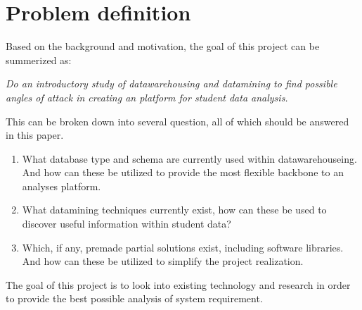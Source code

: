 \section{Problem definition}
	Based on the background and motivation, the goal of this project can be summerized as: 
	
	
	\textit{Do an introductory study of datawarehousing and datamining to find possible angles of attack in
	creating an platform for student data analysis. }\newline
	
	This can be broken down into several question, all of which should be answered in this paper.
	
	\begin{enumerate}
		\item What database type and schema are currently used within datawarehouseing. 
			And how can these be utilized to provide the most flexible backbone to an analyses platform.
		\item What datamining techniques currently exist, how can these be used to discover useful information
		within student data?
		\item Which, if any, premade partial solutions exist, including software libraries. 
		And how can these be utilized to simplify the project realization.
	\end{enumerate}
		
	The goal of this project is to look into existing technology and research in order to provide the best
	possible analysis of system requirement.